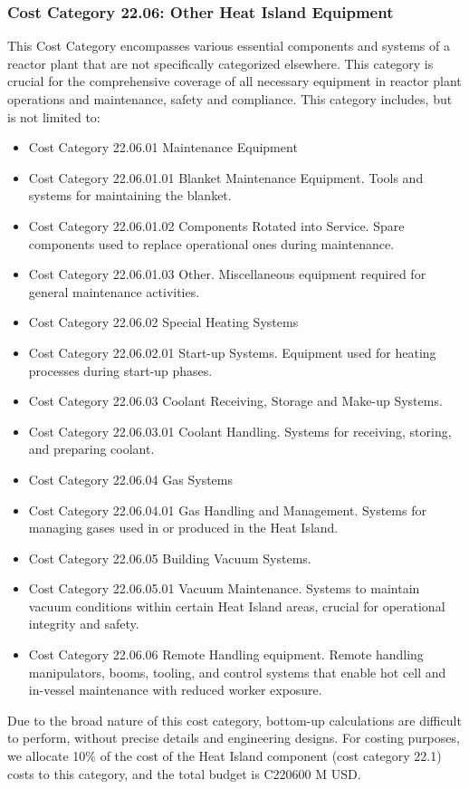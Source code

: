 
\subsubsection{Cost Category 22.06: Other Heat Island Equipment}

This Cost Category encompasses various essential components and systems of a reactor plant that are not specifically categorized elsewhere. This category is crucial for the comprehensive coverage of all necessary equipment in reactor plant operations and maintenance, safety and compliance.  This category includes, but is not limited to:


\begin{itemize}
    \item Cost Category 22.06.01 Maintenance Equipment
    \item Cost Category 22.06.01.01 Blanket Maintenance Equipment. Tools and systems for maintaining the blanket.
    \item Cost Category 22.06.01.02 Components Rotated into Service. Spare components used to replace operational ones during maintenance.
    \item Cost Category 22.06.01.03 Other. Miscellaneous equipment required for general maintenance activities.
    \item Cost Category 22.06.02 Special Heating Systems
    \item Cost Category 22.06.02.01 Start-up Systems. Equipment used for heating processes during start-up phases.
    \item Cost Category 22.06.03 Coolant Receiving, Storage and Make-up Systems.
    \item Cost Category 22.06.03.01 Coolant Handling. Systems for receiving, storing, and preparing coolant.
    \item Cost Category 22.06.04 Gas Systems
    \item Cost Category 22.06.04.01 Gas Handling and Management. Systems for managing gases used in or produced in the Heat Island.
    \item Cost Category 22.06.05 Building Vacuum Systems.
    \item Cost Category 22.06.05.01 Vacuum Maintenance. Systems to maintain vacuum conditions within certain Heat Island areas, crucial for operational integrity and safety.
\ifsafetycosts
    \item Cost Category 22.06.06 Remote Handling equipment. Remote handling manipulators, booms, tooling, and control systems that enable hot cell and in-vessel maintenance with reduced worker exposure.
\fi
\end{itemize}

Due to the broad nature of this cost category, bottom-up calculations are difficult to perform, without precise details and engineering designs. For costing purposes, we allocate 10\% of the cost of the Heat Island component (cost category 22.1) costs to this category, and the total budget is C220600 M USD.